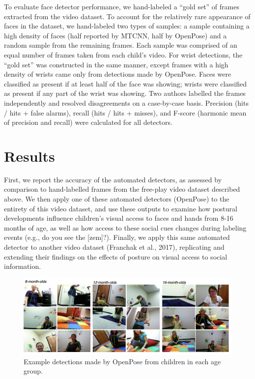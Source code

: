 \documentclass[english,man]{apa6}
\begin{document}
To evaluate face detector performance, we hand-labeled a \enquote{gold
set} of frames extracted from the video dataset. To account for the
relatively rare appearance of faces in the dataset, we hand-labeled two
types of samples: a sample containing a high density of faces (half
reported by MTCNN, half by OpenPose) and a random sample from the
remaining frames. Each sample was comprised of an equal number of frames
taken from each child's video. For wrist detections, the \enquote{gold
set} was constructed in the same manner, except frames with a high
density of wrists came only from detections made by OpenPose. Faces were
classified as present if at least half of the face was showing; wrists
were classified as present if any part of the wrist was showing. Two
authors labelled the frames independently and resolved disagreements on
a case-by-case basis. Precision (hits / hits + false alarms), recall
(hits / hits + misses), and F-score (harmonic mean of precision and
recall) were calculated for all detectors.

\section{Results}\label{results}

First, we report the accuracy of the automated detectors, as assessed by
comparison to hand-labelled frames from the free-play video dataset
described above. We then apply one of these automated detectors
(OpenPose) to the entirety of this video dataset, and use these outputs
to examine how postural developments influence children's visual access
to faces and hands from 8-16 months of age, as well as how access to
these social cues changes during labeling events (e.g., do you see the
{[}zem{]}?). Finally, we apply this same automated detector to another
video dataset (Franchak et al., 2017), replicating and extending their
findings on the effects of posture on visual access to social
information.

\begin{figure}[H]
\includegraphics[width=1\linewidth]{images/exampe_detections} \caption{Example detections made by OpenPose from children in each age group.}\label{fig:exampledetections}
\end{figure}
\end{document}
